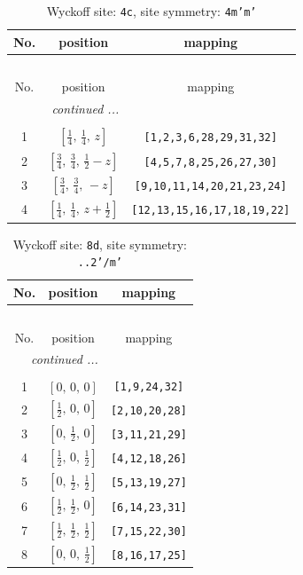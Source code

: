 \documentclass[fleqn,8pt]{jsarticle}
\begin{document}
\renewcommand{\arraystretch}{1.2}
\begin{longtable}{ccc}
\caption{Wyckoff site: {\tt 4c}, site symmetry: {\tt 4m'm'}}
 \\
 \hline \hline
No. & position & mapping \\ \hline \endfirsthead

\multicolumn{2}{l}{\tablename\ \thetable{}} \\
 \hline \hline
No. & position & mapping \\ \hline \endhead

 \hline \hline
\multicolumn{2}{r}{\footnotesize\it continued ...} \\ \endfoot

 \hline \hline
\multicolumn{2}{r}{} \\ \endlastfoot

1 & $\left[ \frac{1}{4},\, \frac{1}{4},\, z \right]$ & {\tt [1,2,3,6,28,29,31,32]} \\ \hline
2 & $\left[ \frac{3}{4},\, \frac{3}{4},\, \frac{1}{2} - z \right]$ & {\tt [4,5,7,8,25,26,27,30]} \\ \hline
3 & $\left[ \frac{3}{4},\, \frac{3}{4},\, - z \right]$ & {\tt [9,10,11,14,20,21,23,24]} \\ \hline
4 & $\left[ \frac{1}{4},\, \frac{1}{4},\, z + \frac{1}{2} \right]$ & {\tt [12,13,15,16,17,18,19,22]} \\
\end{longtable}
\renewcommand{\arraystretch}{1.2}
\begin{longtable}{ccc}
\caption{Wyckoff site: {\tt 8d}, site symmetry: {\tt ..2'/m'}}
 \\
 \hline \hline
No. & position & mapping \\ \hline \endfirsthead

\multicolumn{2}{l}{\tablename\ \thetable{}} \\
 \hline \hline
No. & position & mapping \\ \hline \endhead

 \hline \hline
\multicolumn{2}{r}{\footnotesize\it continued ...} \\ \endfoot

 \hline \hline
\multicolumn{2}{r}{} \\ \endlastfoot

1 & $\left[ 0,\, 0,\, 0 \right]$ & {\tt [1,9,24,32]} \\ \hline
2 & $\left[ \frac{1}{2},\, 0,\, 0 \right]$ & {\tt [2,10,20,28]} \\ \hline
3 & $\left[ 0,\, \frac{1}{2},\, 0 \right]$ & {\tt [3,11,21,29]} \\ \hline
4 & $\left[ \frac{1}{2},\, 0,\, \frac{1}{2} \right]$ & {\tt [4,12,18,26]} \\ \hline
5 & $\left[ 0,\, \frac{1}{2},\, \frac{1}{2} \right]$ & {\tt [5,13,19,27]} \\ \hline
6 & $\left[ \frac{1}{2},\, \frac{1}{2},\, 0 \right]$ & {\tt [6,14,23,31]} \\ \hline
7 & $\left[ \frac{1}{2},\, \frac{1}{2},\, \frac{1}{2} \right]$ & {\tt [7,15,22,30]} \\ \hline
8 & $\left[ 0,\, 0,\, \frac{1}{2} \right]$ & {\tt [8,16,17,25]} \\
\end{longtable}
\end{document}
